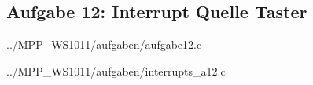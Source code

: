 \subsection*{Aufgabe 12: Interrupt Quelle Taster}


{../MPP_WS1011/aufgaben/aufgabe12.c}


{../MPP_WS1011/aufgaben/interrupts_a12.c}
